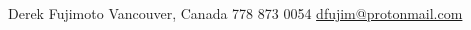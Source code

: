 \documentclass[lighthipster]{simplehipstercv}
\begin{document}
\begin{paracol}{2}
\vspace{0.5cm}
\vfill %

\begin{center}\fontfamily{\sfdefault}\selectfont \color{black!70}
{\small Derek Fujimoto  Vancouver, Canada  778 873 0054  \href{mailto:dfujim@protonmail.com}{\color{black!70} dfujim@protonmail.com}
\vspace{-0.1cm}
}
\end{center}
\end{paracol}
\end{document}
